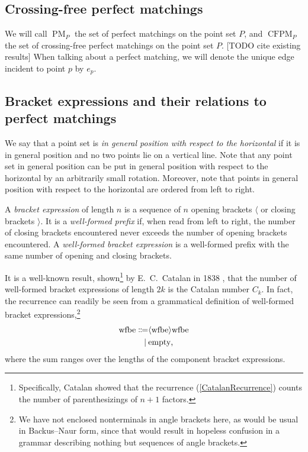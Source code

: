 \documentclass[10pt, a4paper, twoside]{basestyle}
\DeclareMathOperator{\PM}{PM}
\DeclareMathOperator{\CFPM}{CFPM}
\begin{document}
\subsection{Crossing-free perfect matchings}
We will call $\PM_P$ the set of perfect matchings on the point set $P$, and $\CFPM_P$ the set
of crossing-free perfect matchings on the point set $P$.
[TODO cite existing results]
When talking about a perfect matching, we will denote the unique edge incident to point $p$ by
$e_p$.

\subsection{Bracket expressions and their relations to perfect matchings}

We say that a point set is \emph{in general position with respect to the horizontal} if it
is in general position and no two points lie on a vertical line. Note that any point set in
general position can be put in general position with respect to the horizontal by an arbitrarily
small rotation. Moreover, note that points in general position with respect to the horizontal
are ordered from left to right.

A \emph{bracket expression} of length $n$ is a sequence of $n$ opening brackets $\langle$ or closing
brackets $\rangle$.
It is a \emph{well-formed prefix} if, when read from left to right, the number of closing brackets
encountered never exceeds the number of opening brackets encountered.
A \emph{well-formed bracket expression} is a well-formed prefix with the same number of opening and
closing brackets.

It is a well-known result, shown\footnote{Specifically, Catalan showed that the recurrence (\ref{CatalanRecurrence})
counts the number of parenthesizings of $n+1$ factors.} by E.~C.~Catalan in 1838 \cite{Catalan1838}, that the
number of well-formed bracket expressions
of length $2k$ is the Catalan number $C_k$. In fact, the recurrence can readily be seen from
a grammatical definition of well-formed bracket expressions,\footnote{We have not enclosed nonterminals
in angle brackets here, as would be usual in Backus--Naur form, since that would result in hopeless
confusion in a grammar describing nothing but sequences of angle brackets.}\begin{align*}
\text{wfbe} \Coloneq
& \langle \text{wfbe} \rangle \text{wfbe} \\
\mid\: & \text{empty}\text,
\end{align*}
where the sum ranges over the lengths of the component bracket expressions.
\end{document}
